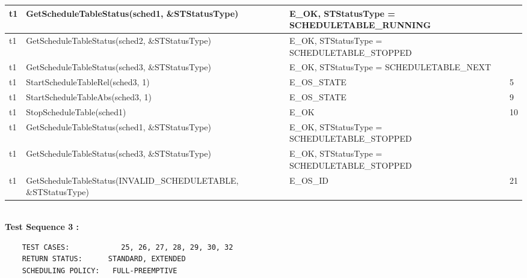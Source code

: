 \documentclass[10pt]{article}
\newlength{\Li}\settowidth{\Li}{Running}
\newlength{\Lii}\setlength{\Lii}{7cm}
\newlength{\Liiii}\setlength{\Liiii}{0.9cm}
\newlength{\Liii}\setlength{\Liii}{\textwidth} \addtolength{\Liii}{-\Li} \addtolength{\Liii}{-\Lii} \addtolength{\Liii}{-\Liiii}
\begin{document}
\begin{supertabular}{|p{\Li}|p{\Lii}|p{\Liii}|p{\Liiii}|}
	t1	& GetScheduleTableStatus(sched1, \&STStatusType)						& E\_OK, STStatusType = SCHEDULETABLE\_RUNNING		& \\ \hline
	t1	& GetScheduleTableStatus(sched2, \&STStatusType)						& E\_OK, STStatusType = SCHEDULETABLE\_STOPPED		& \\ \hline
	t1	& GetScheduleTableStatus(sched3, \&STStatusType)						& E\_OK, STStatusType = SCHEDULETABLE\_NEXT			& \\ \hline
	t1	& StartScheduleTableRel(sched3, 1)									& E\_OS\_STATE										& 5 \\ \hline
	t1	& StartScheduleTableAbs(sched3, 1)									& E\_OS\_STATE										& 9 \\ \hline
	t1	& StopScheduleTable(sched1)											& E\_OK												& 10 \\ \hline
	t1	& GetScheduleTableStatus(sched1, \&STStatusType)						& E\_OK, STStatusType = SCHEDULETABLE\_STOPPED		& \\ \hline
	t1	& GetScheduleTableStatus(sched3, \&STStatusType)						& E\_OK, STStatusType = SCHEDULETABLE\_STOPPED		& \\ \hline
	t1	& GetScheduleTableStatus(INVALID\_SCHEDULETABLE, \&STStatusType)		& E\_OS\_ID											& 21 \\ \hline
	\end{supertabular}\\

	\textbf{Test Sequence 3 :}
	\begin{lstlisting}
	TEST CASES:		       25, 26, 27, 28, 29, 30, 32
	RETURN STATUS:	  	STANDARD, EXTENDED
	SCHEDULING POLICY:   FULL-PREEMPTIVE
	\end{lstlisting}
	
	
\end{document}
